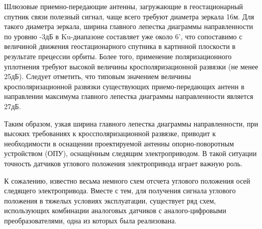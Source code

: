 Шлюзовые приемно-передающие антенны, загружающие в геостационарный спутник связи полезный сигнал, чаще всего требуют диаметра зеркала 16м. 
Для такого диаметра зеркала, ширина главного лепестка диаграммы направленности по уровню -3дБ в Ku-диапазоне составляет уже около 6', 
что сопоставимо с величиной движения геостационарного спутника в картинной плоскости в результате прецессии орбиты. 
Более того, применение поляризационного уплотнения требуют высокой величины кросполяризационной развязки (не менее 25дБ). 
Следует отметить, что типовым значением величины кросполяризационной развязки существующих приемо-передающих антенн 
в направлении максимума главного лепестка диаграммы направленности является 27дБ. 

Таким образом, узкая ширина главного лепестка диаграммы направленности, при высоких требованиях к кроссполяризационной развязке, 
приводит к необходимости в оснащении проектируемой антенны опорно-поворотным устройством (ОПУ), оснащённым следящим электроприводом.  
В такой ситуации точность датчиков углового положения электропривода играет важную роль.  

К сожалению, известно весьма немного схем отсчета углового положения осей следящего электропривода. Вместе с тем, для получения сигнала углового положения в тяжелых условиях эксплуатации, 
существует ряд схем, использующих комбинации аналоговых датчиков с аналого-цифровыми преобразователями, одна из которых была реализована.
